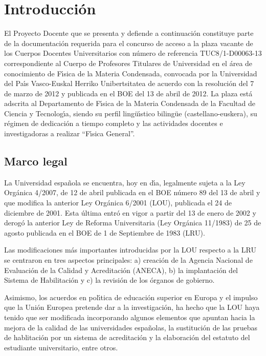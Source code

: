 \chapter{Introducci\'{o}n}
\label{PD-intro}



El Proyecto Docente que se presenta y defiende a continuaci\'{o}n constituye
 parte de la documentaci\'{o}n requerida   para el  concurso de acceso a la plaza 
vacante de los Cuerpos Docentes Universitarios con n\'{u}mero de 
referencia TUC8/1-D00063-13  correspondiente  al 
Cuerpo de Profesores Titulares  de Universidad en el \'{a}rea de
conocimiento de  F\'{\i}sica de 
la Materia Condensada, 
convocada por la Universidad del Pa\'{\i}s Vasco-Euskal Herriko Unibertsitatea
de acuerdo con la resoluci\'{o}n del 7 de marzo de 2012 y
 publicada en el BOE del 13 de abril de 2012.
 La  plaza est\'{a} adscrita al Departamento de F\'{\i}sica 
de la Materia Condensada de la Facultad de Ciencia y Tecnolog\'{\i}a,
siendo su perfil ling\"{u}\'{\i}stico biling\"{u}e (castellano-euskera), 
su r\'{e}gimen de dedicaci\'{o}n a tiempo completo y las actividades
docentes e investigadoras a realizar ``F\'{\i}sica General''.


\section{Marco legal}

La Universidad espa\~{n}ola se encuentra, hoy en d\'{\i}a,
 legalmente sujeta a la Ley Org\'{a}nica 4/2007, de 12 de abril publicada 
en el BOE n\'{u}mero 89 del 13 de abril y que modifica la anterior 
Ley Org\'{a}nica 6/2001 (LOU), publicada el 24 de diciembre de 2001. 
Esta \'{u}ltima entr\'{o} en vigor a partir del 13 de enero de 2002 
y derog\'{o} la anterior Ley de Reforma Universitaria (Ley Org\'{a}nica
 11/1983) 
de 25 de agosto publicada en el BOE de 1 de Septiembre de 1983 (LRU).

Las modificaciones m\'{a}s importantes introducidas por la LOU respecto a
 la LRU se centraron en tres aspectos principales:
 a) creaci\'{o}n de la Agencia Nacional de Evaluaci\'{o}n de la Calidad 
y Acreditaci\'{o}n (ANECA), b) la implantaci\'{o}n del Sistema 
de Habilitaci\'{o}n y c) la revisi\'{o}n de los \'{o}rganos de gobierno.


Asimismo, los acuerdos  en pol\'{\i}tica de educaci\'{o}n
 superior en Europa y el impulso que la Uni\'{o}n Europea pretende
 dar a la investigaci\'{o}n, ha hecho que la LOU haya tenido que ser 
modificada incorporando algunos elementos que apuntan hacia la mejora 
de la calidad de las universidades espa\~{n}olas,  la sustituci\'{o}n
 de las pruebas de hablitaci\'{o}n por un sistema de acreditaci\'{o}n
 y la elaboraci\'{o}n del estatuto del estudiante universitario, entre otros. 

